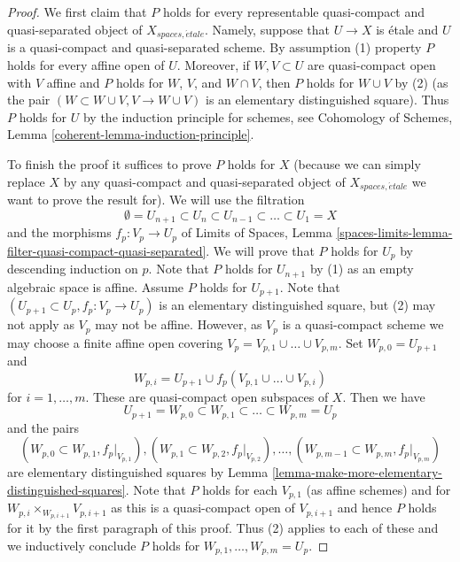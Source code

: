 \begin{proof}
We first claim that $P$ holds for every representable
quasi-compact and quasi-separated object of $X_{spaces, \acute{e}tale}$.
Namely, suppose that $U \to X$ is \'etale and $U$ is a
quasi-compact and quasi-separated scheme. By assumption (1)
property $P$ holds for every affine open of $U$. Moreover, if
$W, V \subset U$ are quasi-compact open with $V$ affine and $P$ holds for 
$W$, $V$, and $W \cap V$, then $P$ holds for $W \cup V$ by (2)
(as the pair $(W \subset W \cup V, V \to W \cup V)$ is an elementary
distinguished square). Thus $P$ holds for $U$ by the induction
principle for schemes, see
Cohomology of Schemes, Lemma \ref{coherent-lemma-induction-principle}.

\medskip\noindent
To finish the proof it suffices to prove $P$ holds for $X$
(because we can simply replace $X$ by any quasi-compact and quasi-separated
object of $X_{spaces, \acute{e}tale}$ we want to prove the result for).
We will use the filtration
$$
\emptyset = U_{n + 1} \subset
U_n \subset U_{n - 1} \subset \ldots \subset U_1 = X
$$
and the morphisms $f_p : V_p \to U_p$ of
Limits of Spaces, Lemma
\ref{spaces-limits-lemma-filter-quasi-compact-quasi-separated}.
We will prove that $P$ holds for $U_p$ by descending induction on $p$.
Note that $P$ holds for $U_{n + 1}$ by (1)
as an empty algebraic space is affine. Assume $P$ holds for $U_{p + 1}$.
Note that $(U_{p + 1} \subset U_p, f_p : V_p \to U_p)$ is an elementary
distinguished square, but (2) may not apply as $V_p$ may not be affine.
However, as $V_p$ is a quasi-compact scheme we may choose a finite affine open
covering $V_p = V_{p, 1} \cup \ldots \cup V_{p, m}$.
Set $W_{p, 0} = U_{p + 1}$ and
$$
W_{p, i} = U_{p + 1} \cup f_p(V_{p, 1} \cup \ldots \cup V_{p, i})
$$
for $i = 1, \ldots, m$. These are quasi-compact open subspaces of $X$.
Then we have
$$
U_{p + 1} = W_{p, 0} \subset
W_{p, 1} \subset \ldots \subset
W_{p, m} = U_p
$$
and the pairs
$$
(W_{p, 0} \subset W_{p, 1}, f_p|_{V_{p, 1}}),
(W_{p, 1} \subset W_{p, 2}, f_p|_{V_{p, 2}}),\ldots,
(W_{p, m - 1} \subset W_{p, m}, f_p|_{V_{p, m}})
$$
are elementary distinguished squares by
Lemma \ref{lemma-make-more-elementary-distinguished-squares}.
Note that $P$ holds for each $V_{p, 1}$ (as affine schemes) and for
$W_{p, i} \times_{W_{p, i + 1}} V_{p, i + 1}$ as this is a quasi-compact
open of $V_{p, i + 1}$ and hence $P$ holds for it by the first paragraph
of this proof. Thus (2) applies to each of these and we inductively
conclude $P$ holds for $W_{p, 1}, \ldots, W_{p, m} = U_p$.
\end{proof}

